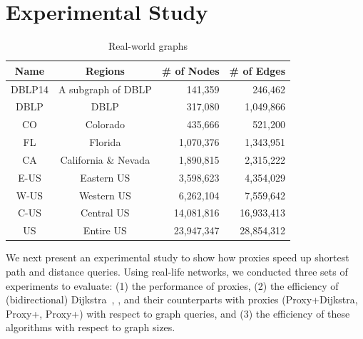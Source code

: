 \section{Experimental Study}
\label{sec-expt}

\begin{table}[t!]
\label{tab-datasets}
\begin{center}
\begin{scriptsize}
\vspace{2ex}
\begin{tabular}{|c|c|r|r|}
\hline
  Name                            &  Regions               & \# of Nodes  &  \# of Edges \\
\hline\hline
DBLP14    &   A subgraph of DBLP                 & 141,359  &   246,462 \\ \hline
DBLP    & DBLP & 317,080 & 1,049,866 \\ \hline
CO      &  Colorado              & 435,666      &  521,200  \\ \hline
FL      &  Florida               & 1,070,376    &  1,343,951  \\ \hline
CA      &  California \& Nevada   & 1,890,815   &  2,315,222  \\ \hline
E-US    &  Eastern US            & 3,598,623    &  4,354,029 \\ \hline
W-US    &  Western US            & 6,262,104    &  7,559,642  \\ \hline
C-US    &  Central US            & 14,081,816   &  16,933,413 \\ \hline
US      &  Entire US             & 23,947,347   &  28,854,312  \\ \hline
\end{tabular}
\end{scriptsize}
\end{center}
\vspace{0ex}
\caption{Real-world graphs}
\vspace{-6ex}
\end{table}

We next present an experimental study to show how proxies speed up shortest  path and distance queries.
Using real-life networks, we conducted three
sets of experiments to evaluate:
(1) the performance of proxies,
(2) the efficiency of (bidirectional) Dijkstra~\cite{LubyR89}, \arcflag \cite{MohringSSWW05}, \tnr \cite{arz2013transit} and their counterparts with proxies (Proxy+Dijkstra, Proxy+\arcflag, Proxy+\tnr) with respect to  graph queries, and (3) the efficiency of these algorithms with respect to graph sizes.


